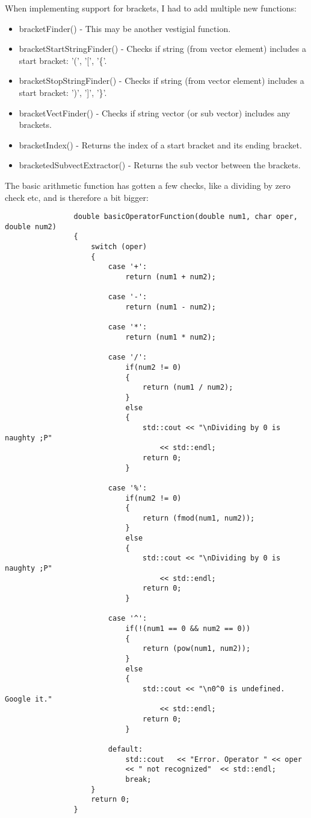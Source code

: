 \documentclass{article}
\begin{document}
			When implementing support for brackets, I had to add multiple new functions:
			\begin{itemize}
				\item bracketFinder()				- This may be another vestigial function.
				\item bracketStartStringFinder()	- Checks if string (from vector element) includes a start bracket: '(', '[', '\{'.
				\item bracketStopStringFinder()		- Checks if string (from vector element) includes a start bracket: ')', ']', '\}'.
				\item bracketVectFinder()			- Checks if string vector (or sub vector) includes any brackets.
				\item bracketIndex()				- Returns the index of a start bracket and its ending bracket.
				\item bracketedSubvectExtractor()	- Returns the sub vector between the brackets.
			\end{itemize}
			
			The basic arithmetic function has gotten a few checks, like a dividing by zero check etc, and is therefore a bit bigger:
			\begin{lstlisting}
				double basicOperatorFunction(double num1, char oper, double num2)
				{
					switch (oper)
					{
						case '+':
							return (num1 + num2);
							
						case '-':
							return (num1 - num2);
							
						case '*':
							return (num1 * num2);
							
						case '/':
							if(num2 != 0)
							{
								return (num1 / num2);
							}
							else
							{
								std::cout << "\nDividing by 0 is naughty ;P"
									<< std::endl;
								return 0;
							}
							
						case '%':
							if(num2 != 0)
							{
								return (fmod(num1, num2));
							}
							else
							{
								std::cout << "\nDividing by 0 is naughty ;P"
									<< std::endl;
								return 0;
							}
							
						case '^':
							if(!(num1 == 0 && num2 == 0))
							{
								return (pow(num1, num2));
							}
							else
							{
								std::cout << "\n0^0 is undefined. Google it."
									<< std::endl;
								return 0;
							}
							
						default:
							std::cout   << "Error. Operator " << oper
							<< " not recognized"  << std::endl;
							break;
					}
					return 0;
				}
			\end{lstlisting}
			
\end{document}
